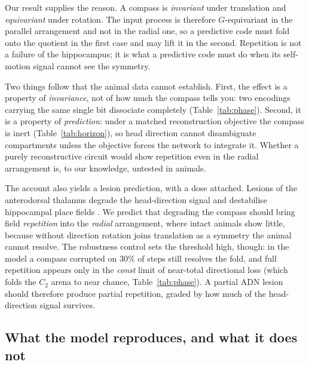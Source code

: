 \documentclass[9pt,lineno]{elife}
\begin{document}
Our result supplies the reason. A compass is \emph{invariant} under translation and
\emph{equivariant} under rotation. The input process is therefore $G$-equivariant in the parallel
arrangement and not in the radial one, so a predictive code must fold onto the quotient in the
first case and may lift it in the second. Repetition is not a failure of the hippocampus; it is
what a predictive code must do when its self-motion signal cannot see the symmetry.

Two things follow that the animal data cannot establish. First, the effect is a property of
\emph{invariance}, not of how much the compass tells you: two encodings carrying the same single
bit dissociate completely (Table~\ref{tab:phase}). Second, it is a property of \emph{prediction}:
under a matched reconstruction objective the compass is inert (Table~\ref{tab:horizon}), so head
direction cannot disambiguate compartments unless the objective forces the network to integrate
it. Whether a purely reconstructive circuit would show repetition even in the radial arrangement
is, to our knowledge, untested in animals.

The account also yields a lesion prediction, with a dose attached. Lesions of the anterodorsal
thalamus degrade the head-direction signal and destabilise hippocampal place fields
\citep{calton2003}. We predict that degrading the compass should bring field \emph{repetition}
into the \emph{radial} arrangement, where intact animals show little, because without direction
rotation joins translation as a symmetry the animal cannot resolve. The robustness control sets
the threshold high, though: in the model a compass corrupted on $30\%$ of steps still resolves
the fold, and full repetition appears only in the \textit{const} limit of near-total directional
loss (which folds the $C_2$ arena to near chance, Table~\ref{tab:phase}). A partial ADN lesion
should therefore produce partial repetition, graded by how much of the head-direction signal
survives.


\subsection*{What the model reproduces, and what it does not}
\end{document}
